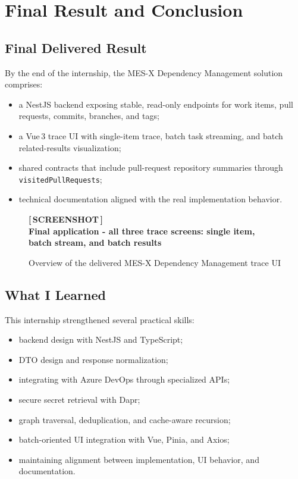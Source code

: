 \documentclass[12pt,a4paper]{report}
\newcommand{\screenshotwide}[2][Screenshot placeholder]{%
  \begin{figure}[H]
    \centering
    \begin{tcolorbox}[
      enhanced,
      colback=screenshotbg,
      colframe=screenshotborder,
      boxrule=1pt,
      arc=4pt,
      left=4pt, right=4pt, top=4pt, bottom=4pt,
      width=\textwidth,
      height=9cm,
      valign=center,
    ]
      \centering
      \color{primary}
      \large\bfseries [\,SCREENSHOT\,]\\[6pt]
      \normalsize\normalfont\color{darkgray}#1
    \end{tcolorbox}
    \caption{#2}
  \end{figure}%
}
\newcommand{\code}[1]{\texttt{\small\color{codered}#1}}
\begin{document}
\chapter{Final Result and Conclusion}

\section{Final Delivered Result}

By the end of the internship, the MES-X Dependency Management solution
comprises:

\begin{itemize}
  \item a NestJS backend exposing stable, read-only endpoints for work items,
        pull requests, commits, branches, and tags;
  \item a Vue\,3 trace UI with single-item trace, batch task streaming, and
        batch related-results visualization;
  \item shared contracts that include pull-request repository summaries through
        \code{visitedPullRequests};
  \item technical documentation aligned with the real implementation behavior.
\end{itemize}

\screenshotwide[Final application - all three trace screens: single item, batch stream, and batch results]{Overview of the delivered MES-X Dependency Management trace UI}

\section{What I Learned}

This internship strengthened several practical skills:

\begin{itemize}
  \item backend design with NestJS and TypeScript;
  \item DTO design and response normalization;
  \item integrating with Azure DevOps through specialized APIs;
  \item secure secret retrieval with Dapr;
  \item graph traversal, deduplication, and cache-aware recursion;
  \item batch-oriented UI integration with Vue, Pinia, and Axios;
  \item maintaining alignment between implementation, UI behavior, and documentation.
\end{itemize}
\end{document}
